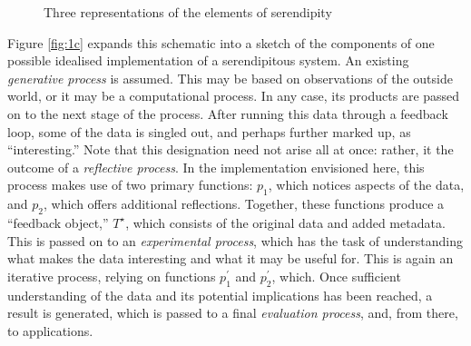 \afterpage{\clearpage}
\begin{figure}[p]
\begin{minipage}[b]{\textwidth}
{\centering


\par}
\vspace{-4mm}
\label{fig:1a}
\end{minipage}
\medskip

\begin{minipage}[b]{\textwidth}
{\centering

\par}
\label{fig:1b}
\end{minipage}
\medskip

\begin{minipage}[b]{\textwidth}
{\centering


\par}
\smallskip

\label{fig:1c}
\end{minipage}
\bigskip

\caption{Three representations of the elements of serendipity}\label{fig:model}
\end{figure}

Figure \ref{fig:1c} expands this schematic into a sketch of the
components of one possible idealised implementation of a serendipitous
system.  An existing \emph{generative process} is assumed.  This may
be based on observations of the outside world, or it may be a
computational process.  In any case, its products are passed on to the
next stage of the process.  After running this data through a feedback
loop, some of the data is singled out, and perhaps further marked up,
as ``interesting.''  Note that this designation need not arise all at
once: rather, it the outcome of a \emph{reflective process}.  In the
implementation envisioned here, this process makes use of two primary
functions: $p_1$, which notices aspects of the data, and $p_2$, which
offers additional reflections.  Together, these functions produce a
``feedback object,'' $T^{\star}$, which consists of the original data
and added metadata.  This is passed on to an \emph{experimental
  process}, which has the task of understanding what makes the data
interesting and what it may be useful for.  This is again an iterative
process, relying on functions $p^{\prime}_1$ and $p^{\prime}_2$,
which.  Once sufficient understanding of the data and its potential
implications has been reached, a result is generated, which is passed
to a final \emph{evaluation process}, and, from there, to
applications.

